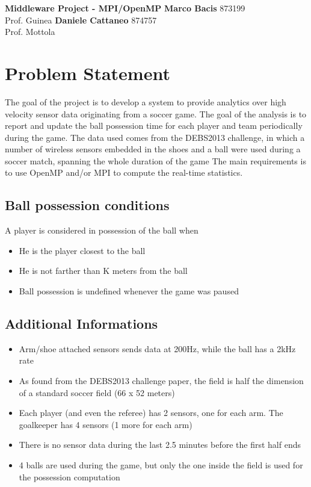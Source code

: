 \documentclass[a4paper, 10pt]{article}
\begin{document}
\noindent
\large\textbf{Middleware Project - MPI/OpenMP} \hfill \textbf{Marco Bacis} 873199 \\
Prof. Guinea \hfill \textbf{Daniele Cattaneo} 874757 \\
Prof. Mottola

\section*{Problem Statement}
The goal of the project is to develop a system to provide analytics over high velocity sensor data originating from a soccer game.
The goal of the analysis is to report and update the ball possession time for each player and team periodically during the game.
The data used comes from the DEBS2013 challenge, in which a number of wireless sensors embedded in the shoes and a ball were used during a soccer match, spanning the whole duration of the game
The main requirements is to use OpenMP and/or MPI to compute the real-time statistics.

\subsection*{Ball possession conditions}
A player is considered in possession of the ball when
\begin{itemize}
\item He is the player closest to the ball
\item He is not farther than K meters from the ball
\item Ball possession is undefined whenever the game was paused
\end{itemize}

\subsection*{Additional Informations}
\begin{itemize}
    \item Arm/shoe attached sensors sends data at 200Hz, while the ball has a 2kHz rate
    \item As found from the DEBS2013 challenge paper, the field is half the dimension of a standard soccer field (66 x 52 meters)
    \item Each player (and even the referee) has 2 sensors, one for each arm. The goalkeeper has 4 sensors (1 more for each arm)
    \item There is no sensor data during the last 2.5 minutes before the first half ends
    \item 4 balls are used during the game, but only the one inside the field is used for the possession computation
\end{itemize}
\end{document}
